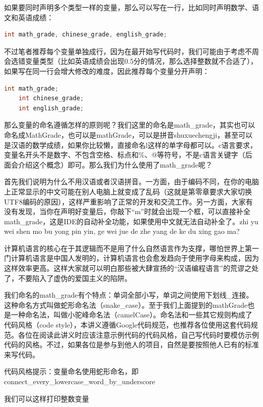 如果要同时声明多个类型一样的变量，那么可以写在一行，比如同时声明数学、语文和英语成绩：

\begin{lstlisting}[language=C]
    int math_grade, chinese_grade, english_grade;
\end{lstlisting}

不过笔者推荐每个变量单独成行，因为在最开始写代码时，我们可能由于考虑不周会选错变量类型（比如英语成绩会出现0.5分的情况，那么选择整数就不合适了），如果写在同一行会增大修改的难度，因此推荐每个变量分开声明：

\begin{lstlisting}[language=C]
    int math_grade;
    int chinese_grade;
    int english_grade;
\end{lstlisting}

那么变量的命名遵循怎样的原则呢？我们这里的命名是math\_grade，其实也可以命名成MathGrade，也可以是mathGrade，可以是拼音shuxuechengji，甚至可以是汉语的数学成绩，如果你比较懒，直接命名l这样的单字母都可以。c语言要求，变量名开头不是数字、不包含空格、标点和\%、@等符号，不是c语言关键字（后面会介绍这个概念）即可。那么我们为什么使用了math\_grade呢？

首先我们说明为什么不用汉语或者汉语拼音。一方面，由于编码不同，在你的电脑上正常显示的中文可能在别人电脑上就变成了乱码（这就是第零章要求大家切换UTF8编码的原因），这样严重影响了正常的开发和交流工作。另一方面，大家有没有发现，当你在声明好变量后，你敲下“m”时就会出现一个框，可以直接补全math\_grade，这是IDE的自动补全功能，如果使用中文就无法自动补全了。zhi yu wei shen mo bu yong pin yin, ge wei jue de zhe yang de ke du xing gao ma?

计算机语言的核心在于其逻辑而不是用了什么自然语言作为支撑，哪怕世界上第一门计算机语言是中国人发明的，计算机语言也会愈发趋向于使用字母来构成，因为这样效率更高。这样大家就可以明白那些被大肆宣扬的“汉语编程语言”的荒谬之处了，不要陷入了虚伪的爱国主义的陷阱。

我们命名的math\_grade有个特点：单词全部小写，单词之间使用下划线\_连接。这种命名方式叫做蛇形命名法（snake\_case）。至于我们上面提到的mathGrade也是一种命名法，叫做小驼峰命名法（camelCase）。命名法和一些其它规则构成了代码风格（code style），本讲义遵循Google代码规范，也推荐各位使用这套代码规范。各位在阅读此讲义时应该注意示例代码的代码风格，自己写代码时要模仿示例代码的风格。不过，如果各位是参与到他人的项目，自然是要按照他人已有的标准来写代码。

代码风格提示：变量命名使用蛇形命名，即connect\_every\_lowercase\_word\_by\_underscore

我们可以这样打印整数变量

